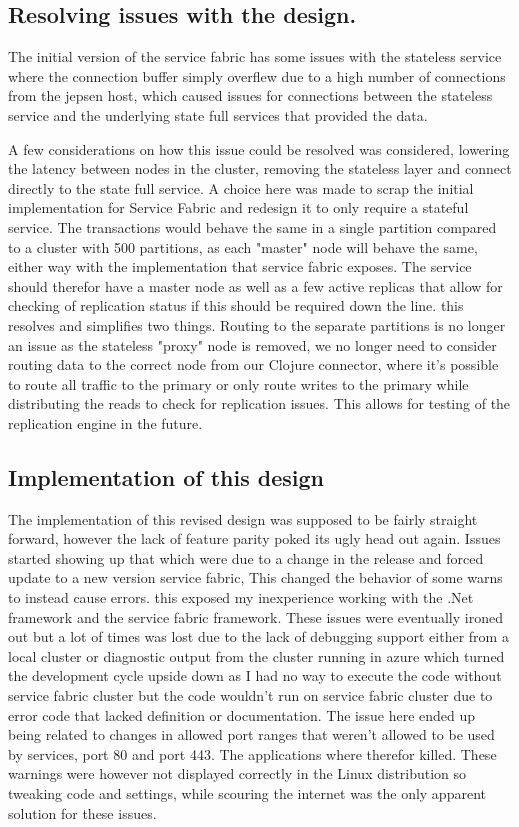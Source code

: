 \documentclass[a4paper,10pt,titlepage]{report}
\begin{document}
\subsection{Resolving issues with the design.}
    
    
    The initial version of the service fabric has some issues with the stateless service where the connection buffer simply overflew due to a high number of connections from the jepsen host, which caused issues for connections between the stateless service and the underlying state full services that provided the data.
    
    A few considerations on how this issue could be resolved was considered, lowering the latency between nodes in the cluster, removing the stateless layer and connect directly to the state full service. A choice here was made to scrap the initial implementation for Service Fabric and redesign it to only require a stateful service. The transactions would behave the same in a  single partition compared to a cluster with 500 partitions, as each "master" node will behave the same, either way with the implementation that service fabric exposes. The service should therefor have a master node as well as a few active replicas that allow for checking of replication status if this should be required down the line. this resolves and simplifies two things. Routing to the separate partitions is no longer an issue as the stateless "proxy" node is removed, we no longer need to consider routing data to the correct node from our Clojure connector, where it's possible to route all traffic to the primary or only route writes to the primary while distributing the reads to check for replication issues. This allows for testing of the replication engine in the future.

 \subsection{Implementation of this design}

    The implementation of this revised design was supposed to be fairly straight forward, however the lack of feature parity poked its ugly head out again. Issues started showing up that which were due to a change in the release and forced update to a new version service fabric, This changed the behavior of some warns to instead cause errors. this exposed my inexperience working with the .Net framework and the service fabric framework. These issues were eventually ironed out but a lot of times was lost due to the lack of debugging support either from a local cluster or diagnostic output from the cluster running in azure which turned the development cycle upside down as I had no way to execute the code without service fabric cluster but the code wouldn't run on service fabric cluster due to error code that lacked definition or documentation. The issue here ended up being related to changes in allowed port ranges that weren't allowed to be used by services, port 80 and port 443. The applications where therefor killed. These warnings were however not displayed correctly in the Linux distribution so tweaking code and settings, while scouring the internet was the only apparent solution for these issues.
\end{document}
